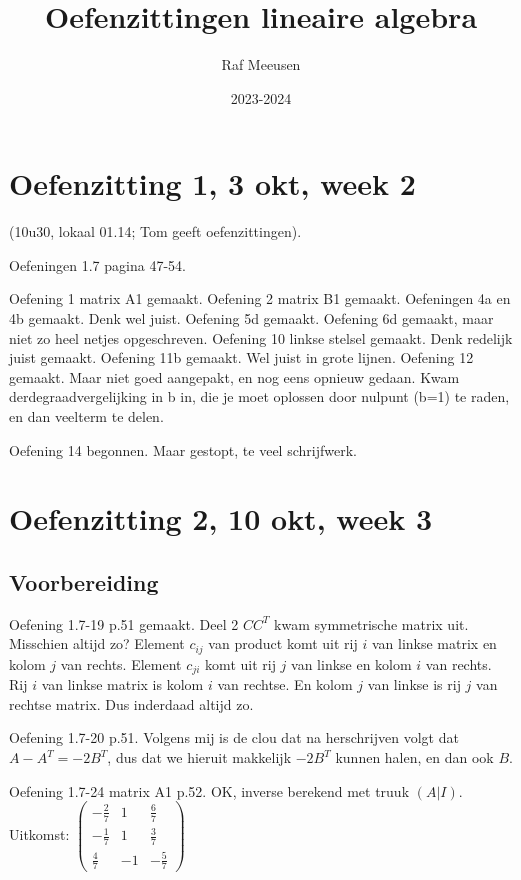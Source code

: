 \documentclass{article}
\title{Oefenzittingen lineaire algebra}
\author{Raf Meeusen}
\date{2023-2024}
\begin{document}
\maketitle

\section{Oefenzitting 1, 3 okt, week 2}

(10u30, lokaal 01.14; Tom geeft oefenzittingen). 

Oefeningen 1.7 pagina 47-54. 

Oefening 1 matrix A1 gemaakt. 
Oefening 2 matrix B1 gemaakt. 
Oefeningen 4a en 4b gemaakt. Denk wel juist. 
Oefening 5d gemaakt. 
Oefening 6d gemaakt, maar niet zo heel netjes opgeschreven. 
Oefening 10 linkse stelsel gemaakt. Denk redelijk juist gemaakt. 
Oefening 11b gemaakt. Wel juist in grote lijnen. 
Oefening 12 gemaakt. Maar niet goed aangepakt, en nog eens opnieuw gedaan. Kwam derdegraadvergelijking in b in, die je moet oplossen door nulpunt (b=1) te raden, en dan veelterm te delen. 



Oefening 14 begonnen. Maar gestopt, te veel schrijfwerk. 



\section{Oefenzitting 2, 10 okt, week 3}

\subsection{Voorbereiding}

Oefening 1.7-19 p.51 gemaakt. Deel 2 $C C^T$ kwam symmetrische matrix uit. Misschien altijd zo? Element $c_{ij}$ van product komt uit rij $i$ van linkse matrix en kolom $j$ van rechts. Element $c_{ji}$ komt uit rij $j$ van linkse en kolom $i$ van rechts. Rij $i$ van linkse matrix is kolom $i$ van rechtse. En kolom $j$ van linkse is rij $j$ van rechtse matrix. Dus inderdaad altijd zo. 


Oefening 1.7-20 p.51. Volgens mij is de clou dat na herschrijven volgt dat $A-A^T = -2B^T$, dus dat we hieruit makkelijk $-2B^T$ kunnen halen, en dan ook $B$. 

Oefening 1.7-24 matrix A1 p.52. OK, inverse berekend met truuk $(A|I)$. Uitkomst: 
\begin{math}
\begin{pmatrix}
-\frac{2}{7} & 1 & \frac{6}{7}\\
-\frac{1}{7} & 1 & \frac{3}{7} \\
\frac{4}{7} & -1 & -\frac{5}{7} 
\end{pmatrix}
\end{math}
\end{document}
